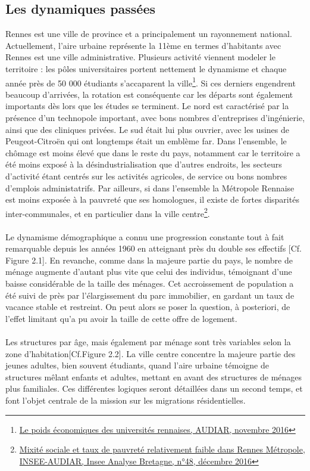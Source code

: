 \documentclass{bredele}
\begin{document}
\subsection{Les dynamiques passées}
Rennes est une ville de province et a principalement un rayonnement national. Actuellement, l’aire urbaine représente la 11ème en termes d’habitants avec 
Rennes est une ville administrative. Plusieurs activité viennent modeler le territoire : les pôles universitaires portent nettement le dynamisme et chaque année près de 50 000 étudiants s'accaparent la ville\footnote{\href{http://www.audiar.org/sites/default/files/documents/observatoires/obs_universites_rennaises_poids_eco_web_0.pdf}{Le poids économiques des universités rennaises, AUDIAR, novembre 2016}}. Si ces derniers engendrent beaucoup d'arrivées, la rotation est conséquente car les départs sont également importants dès lors que les études se terminent. Le nord est caractérisé par la présence d'un technopole important, avec bons nombres d'entreprises d'ingénierie, ainsi que des cliniques privées.  Le sud était lui plus ouvrier, avec les usines de Peugeot-Citroën qui ont longtemps était un emblème far. Dans l'ensemble, le chômage est moins élevé que dans le reste du pays, notamment car le territoire a été moins exposé à la désindustrialisation que d'autres endroits, les secteurs d'activité étant centrés sur les activités agricoles, de service ou bons nombres d'emplois administatrifs. Par ailleurs, si dans l'ensemble la Métropole Rennaise est moins exposée à la pauvreté que ses homologues, il existe de fortes disparités inter-communales, et en particulier dans la ville centre\footnote{\href{https://www.insee.fr/fr/statistiques/fichier/version-html/2511239/br_ina_48.pdf}{Mixité sociale et taux de pauvreté relativement faible dans Rennes Métropole, INSEE-AUDIAR, Insee Analyse Bretagne, n°48, décembre 2016}}.
\\\\Le dynamisme démographique a connu une progression constante tout à fait remarquable depuis les années 1960 en atteignant près du double ses effectifs [Cf. Figure 2.1]. En revanche, comme dans la majeure partie du pays, le nombre de ménage augmente d'autant plus vite que celui des individus, témoignant d'une baisse considérable de la taille des ménages. Cet accroissement de population a été suivi de près par l'élargissement du parc immobilier, en gardant un taux de vacance stable et restreint. On peut alors se poser la question, à posteriori, de l'effet limitant qu'a pu avoir la taille de cette offre de logement.
\\\\Les structures par âge, mais également par ménage sont très variables selon la zone d'habitation[Cf.Figure 2.2]. La ville centre concentre la majeure partie des jeunes adultes, bien souvent étudiants, quand l'aire urbaine témoigne de structures mêlant enfants et adultes, mettant en avant des structures de ménages plus familiales. Ces différentes logiques seront détaillées dans un second temps, et font l'objet centrale de la mission sur les migrations résidentielles.
\end{document}
